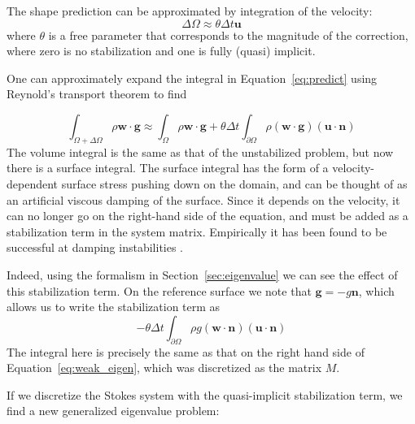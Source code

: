 \documentclass[preprint,12pt,authoryear]{elsarticle}
\begin{document}
The shape prediction can be approximated by integration of the velocity:
\begin{equation}
\Delta \Omega \approx \theta \Delta t \mathbf{u}
\end{equation}
where $\theta$ is a free parameter that corresponds to the magnitude of the 
correction, where zero is no stabilization and one is fully (quasi) implicit.

One can approximately expand the integral in Equation~\eqref{eq:predict} using 
Reynold's transport theorem to find

\begin{equation}
\int_{\Omega + \Delta \Omega} \rho  \mathbf{w} \cdot \mathbf{g} \approx
\int_{\Omega} \rho  \mathbf{w} \cdot \mathbf{g} + \theta \Delta t \int_{\partial \Omega} \rho ( \mathbf{w \cdot g}) (\mathbf{u \cdot n} )
\label{eq:kmm}
\end{equation}
The volume integral is the same as that of the unstabilized problem, but now there is a surface integral.
The surface integral has the form of a velocity-dependent surface stress pushing down on the 
domain, and can be thought of as an artificial viscous damping of the surface.
Since it depends on the velocity, it can no longer go on the right-hand side of the 
equation, and must be added as a stabilization term in the system matrix.  
Empirically it has been found to be successful at damping instabilities \citep{kaus2010stabilization, quinquis2011role, duretz2011discretization}.

Indeed, using the formalism in Section~\ref{sec:eigenvalue} we can see the effect of this 
stabilization term. On the reference surface we note that $\mathbf{g} = -g \mathbf{n}$, which
allows us to write the stabilization term as
\begin{equation}
-\theta \Delta t \int_{\partial \Omega} \rho g ( \mathbf{w \cdot n}) (\mathbf{u \cdot n} )
\end{equation}
The integral here is precisely the same as that on the right hand side of Equation~\eqref{eq:weak_eigen}, which was discretized as the matrix $M$.

If we discretize the Stokes system with the quasi-implicit stabilization term, we find
a new generalized eigenvalue problem:
\end{document}
